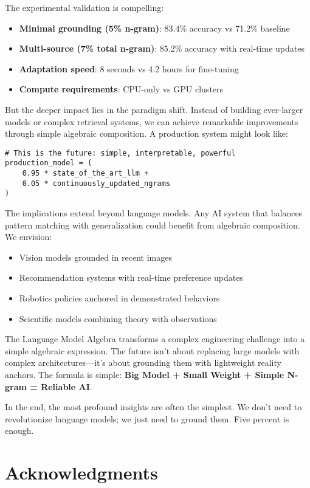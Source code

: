 \documentclass{article}
\theoremstyle{definition}
\begin{document}
The experimental validation is compelling:
\begin{itemize}
    \item \textbf{Minimal grounding (5\% n-gram)}: 83.4\% accuracy vs 71.2\% baseline
    \item \textbf{Multi-source (7\% total n-gram)}: 85.2\% accuracy with real-time updates
    \item \textbf{Adaptation speed}: 8 seconds vs 4.2 hours for fine-tuning
    \item \textbf{Compute requirements}: CPU-only vs GPU clusters
\end{itemize}

But the deeper impact lies in the paradigm shift. Instead of building ever-larger models or complex retrieval systems, we can achieve remarkable improvements through simple algebraic composition. A production system might look like:

\begin{lstlisting}
# This is the future: simple, interpretable, powerful
production_model = (
    0.95 * state_of_the_art_llm +
    0.05 * continuously_updated_ngrams
)
\end{lstlisting}

The implications extend beyond language models. Any AI system that balances pattern matching with generalization could benefit from algebraic composition. We envision:
\begin{itemize}
    \item Vision models grounded in recent images
    \item Recommendation systems with real-time preference updates
    \item Robotics policies anchored in demonstrated behaviors
    \item Scientific models combining theory with observations
\end{itemize}

The Language Model Algebra transforms a complex engineering challenge into a simple algebraic expression. The future isn't about replacing large models with complex architectures---it's about grounding them with lightweight reality anchors. The formula is simple: \textbf{Big Model + Small Weight + Simple N-gram = Reliable AI}.

In the end, the most profound insights are often the simplest. We don't need to revolutionize language models; we just need to ground them. Five percent is enough.

\section*{Acknowledgments}
\end{document}
